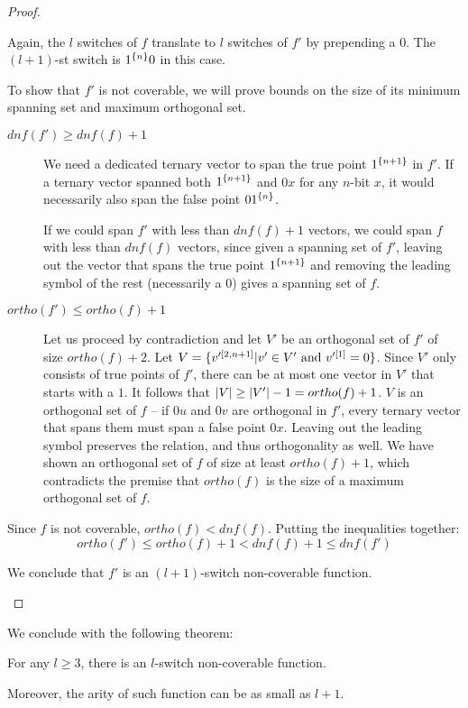 \begin{proof}
\begin{enumerate}
Again,
the $l$ switches of $f$ translate to $l$ switches of $f'$
by prepending a $0$.
The $(l+1)$-st switch is $1^{\{n\}} 0$ in this case.

To show that $f'$ is not coverable,
we will prove bounds on the size of its minimum spanning set and maximum orthogonal set.

\begin{description}
\item[$dnf(f') \geq dnf(f) + 1$]
We need a dedicated ternary vector to span the true point
$1^{\{n+1\}}$ in $f'$.
If a ternary vector spanned
both $1^{\{n+1\}}$
and $0 x$ for any $n$-bit $x$,
it would necessarily also span the false point
$0 1^{\{n\}}$.

If we could span $f'$ with less than $dnf(f) + 1$ vectors,
we could span $f$ with less than $dnf(f)$ vectors,
since given a spanning set of $f'$,
leaving out the vector
that spans the true point $1^{\{n+1\}}$
and removing the leading symbol of the rest
(necessarily a $0$)
gives a spanning set of $f$.

\item[$ortho(f') \leq ortho(f) + 1$]
Let us proceed by contradiction
and let $V'$ be an orthogonal set of $f'$
of size $ortho(f) + 2$.
Let $V = \{v'^{[2, n+1]} | v' \in V'
\text{ and } v'^{[1]} = 0\}$.
Since $V'$ only consists of true points of $f'$,
there can be at most one vector in $V'$
that starts with a $1$.
It follows that
$\lvert V\rvert \geq \lvert V'\rvert - 1 = ortho(f) + 1$.
$V$ is an orthogonal set of $f$ --
if $0 u$ and $0 v$ are orthogonal in $f'$,
every ternary vector that spans them must span
a false point $0 x$.
Leaving out the leading symbol preserves the relation,
and thus orthogonality as well.
We have shown an orthogonal set of $f$ of size at least
$ortho(f) + 1$,
which contradicts the premise that $ortho(f)$ is the size
of a maximum orthogonal set of $f$.
\end{description}

Since $f$ is not coverable,
$ortho(f) < dnf(f)$.
Putting the inequalities together:
$$
ortho(f') \leq ortho(f) + 1 < dnf(f) + 1 \leq dnf(f')
$$

We conclude that $f'$ is an $(l+1)$-switch non-coverable
function.
\end{enumerate}
\end{proof}

We conclude with the following theorem:

\begin{theorem}
For any $l \geq 3$,
there is an $l$-switch non-coverable function.

Moreover, the arity of such function can be as small as
$l+1$.
\end{theorem}

